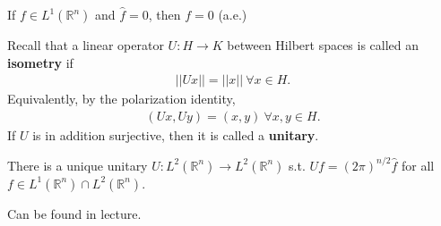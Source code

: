 \fi 
\begin{corollary}
    If \(f\in L^1(\mathbb{R}^n)\) and \(\hat{f}=0\), then \(f=0\) (a.e.)
\end{corollary}

Recall that a linear operator \(U:H\rightarrow K\) between Hilbert spaces is called an \textbf{isometry} if 
\begin{align*}
    ||Ux|| = ||x|| \ \forall x\in H.
\end{align*}
Equivalently, by the polarization identity, 
\begin{align*}
    (Ux,Uy) = (x,y) \ \forall x,y\in H.
\end{align*}
If \(U\) is in addition surjective, then it is called a \textbf{unitary}.
\begin{theorem}[Plancherel]
    There is a unique unitary \(U:L^2(\mathbb{R}^n)\rightarrow L^2(\mathbb{R}^n)\) s.t. \(Uf=(2\pi)^{n/2} \hat{f}\) for all \(f\in L^1(\mathbb{R}^n)\cap L^2(\mathbb{R}^n)\).
\end{theorem}
\ifdetailed 
Can be found in lecture.
\fi 